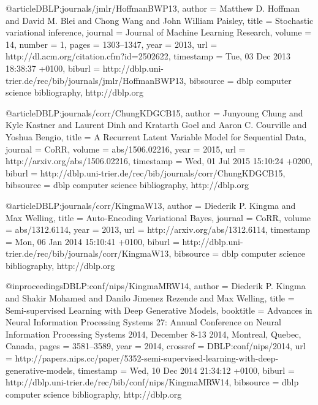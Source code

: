 @article{DBLP:journals/jmlr/HoffmanBWP13,
  author    = {Matthew D. Hoffman and
               David M. Blei and
               Chong Wang and
               John William Paisley},
  title     = {Stochastic variational inference},
  journal   = {Journal of Machine Learning Research},
  volume    = {14},
  number    = {1},
  pages     = {1303--1347},
  year      = {2013},
  url       = {http://dl.acm.org/citation.cfm?id=2502622},
  timestamp = {Tue, 03 Dec 2013 18:38:37 +0100},
  biburl    = {http://dblp.uni-trier.de/rec/bib/journals/jmlr/HoffmanBWP13},
  bibsource = {dblp computer science bibliography, http://dblp.org}
}

@article{DBLP:journals/corr/ChungKDGCB15,
  author    = {Junyoung Chung and
               Kyle Kastner and
               Laurent Dinh and
               Kratarth Goel and
               Aaron C. Courville and
               Yoshua Bengio},
  title     = {A Recurrent Latent Variable Model for Sequential Data},
  journal   = {CoRR},
  volume    = {abs/1506.02216},
  year      = {2015},
  url       = {http://arxiv.org/abs/1506.02216},
  timestamp = {Wed, 01 Jul 2015 15:10:24 +0200},
  biburl    = {http://dblp.uni-trier.de/rec/bib/journals/corr/ChungKDGCB15},
  bibsource = {dblp computer science bibliography, http://dblp.org}
}

@article{DBLP:journals/corr/KingmaW13,
  author    = {Diederik P. Kingma and
               Max Welling},
  title     = {Auto-Encoding Variational Bayes},
  journal   = {CoRR},
  volume    = {abs/1312.6114},
  year      = {2013},
  url       = {http://arxiv.org/abs/1312.6114},
  timestamp = {Mon, 06 Jan 2014 15:10:41 +0100},
  biburl    = {http://dblp.uni-trier.de/rec/bib/journals/corr/KingmaW13},
  bibsource = {dblp computer science bibliography, http://dblp.org}
}

@inproceedings{DBLP:conf/nips/KingmaMRW14,
  author    = {Diederik P. Kingma and
               Shakir Mohamed and
               Danilo Jimenez Rezende and
               Max Welling},
  title     = {Semi-supervised Learning with Deep Generative Models},
  booktitle = {Advances in Neural Information Processing Systems 27: Annual Conference
               on Neural Information Processing Systems 2014, December 8-13 2014,
               Montreal, Quebec, Canada},
  pages     = {3581--3589},
  year      = {2014},
  crossref  = {DBLP:conf/nips/2014},
  url       = {http://papers.nips.cc/paper/5352-semi-supervised-learning-with-deep-generative-models},
  timestamp = {Wed, 10 Dec 2014 21:34:12 +0100},
  biburl    = {http://dblp.uni-trier.de/rec/bib/conf/nips/KingmaMRW14},
  bibsource = {dblp computer science bibliography, http://dblp.org}
}

